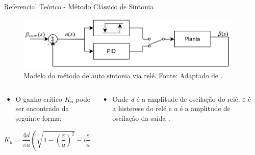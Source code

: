 \documentclass{beamer}
\begin{document}

\begin{frame}{Referencial Teórico - Método Clássico de Sintonia}
    \begin{figure}[HT]
		\begin{center}
		\captionsetup{justification=centering}
        \includegraphics[scale=.3]{../referencial/img/pid_autotuning_relay_astrom_p239}
        \caption{Modelo do método de auto sintonia via relé. \newline
        		 Fonte: Adaptado de .}
		\label{FIG_ADAPTATIVO}
        \end{center}
	\end{figure}
\begin{columns}
    \begin{column}{0.50\textwidth}
	\begin{itemize}
		\item O ganho crítico $K_u$ pode ser encontrado da seguinte forma:
	\end{itemize}
	\begin{equation}\label{eq:n(a)}
	  K_u=\frac{4d}{\pi a}\left(\sqrt{1-\left(\frac{\varepsilon}{a}\right)^{2}}-i\frac{\varepsilon}{a}\right) 
	\end{equation}
    \end{column}
    \begin{column}{0.5\textwidth}

	\begin{itemize}
	\item Onde \textit{d} é a amplitude de oscilação do relé, \textit{$\varepsilon$} é a histerese do relé e \textit{$a$} é a amplitude de oscilação da saída \cite{Levine1996}.
	\end{itemize}
	\end{column}
\end{columns}
\end{frame}

\end{document}
